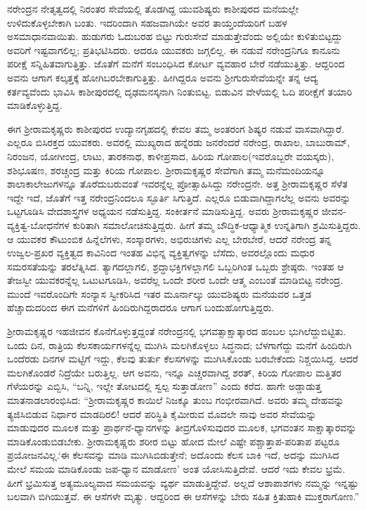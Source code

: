 ನರೇಂದ್ರನ ನೇತೃತ್ವದಲ್ಲಿ ನಿರಂತರ ಸೇವೆಯಲ್ಲಿ ತೊಡಗಿದ್ದ ಯುವಶಿಷ್ಯರು ಕಾಶೀಪುರದ ಮನೆಯಲ್ಲೇ ಉಳಿದುಕೊಳ್ಳಬೇಕಾಗಿ ಬಂತು. ಇದರಿಂದಾಗಿ ಸಹಜವಾಗಿಯೇ ಅವರ ತಾಯ್ತಂದೆಯರಿಗೆ ಬಹಳ ಅಸಮಾಧಾನವಾಯಿತು. ಹುಡುಗರು ಓದುಬರಹ ಬಿಟ್ಟು ಗುರುಸೇವೆ ಮಾಡುತ್ತೇವೆಂದು ಅಲ್ಲಿಯೇ ಕುಳಿತುಬಿಟ್ಟದ್ದು ಅವರಿಗೆ ಇಷ್ಟವಾಗಲಿಲ್ಲ; ಪ್ರತಿಭಟಿಸಿದರು. ಆದರೂ ಯುವಕರು ಜಗ್ಗಲಿಲ್ಲ. ಈ ನಡುವೆ ನರೇಂದ್ರನಿಗೂ ಕಾನೂನು ಪರೀಕ್ಷೆ ಸನ್ನಿಹಿತವಾಗುತ್ತಿತ್ತು. ಜೊತೆಗೆ ಮನೆಗೆ ಸಂಬಂಧಿಸಿದ ಕೋರ್ಟ ವ್ಯವಹಾರ ಬೇರೆ ನಡೆಯುತ್ತಿತ್ತು. ಆದ್ದರಿಂದ ಅವನು ಆಗಾಗ ಕಲ್ಕತ್ತಕ್ಕೆ ಹೋಗಿಬರಬೇಕಾಗುತ್ತಿತ್ತು. ಹೀಗಿದ್ದರೂ ಅವನು ಶ್ರೀಗುರುಸೇವೆಯನ್ನೇ ತನ್ನ ಆದ್ಯ ಕರ್ತವ್ಯವೆಂದು ಭಾವಿಸಿ ಕಾಶೀಪುರದಲ್ಲಿ ದೃಢಮನಸ್ಕನಾಗಿ ನಿಂತುಬಿಟ್ಟ. ಬಿಡುವಿನ ವೇಳೆಯಲ್ಲಿ ಓದಿ ಪರೀಕ್ಷೆಗೆ ತಯಾರಿ ಮಾಡಿಕೊಳ್ಳುತ್ತಿದ್ದ.

ಈಗ ಶ್ರೀರಾಮಕೃಷ್ಣರು ಕಾಶೀಪುರದ ಉದ್ಯಾನಗೃಹದಲ್ಲಿ ಕೇವಲ ತಮ್ಮ ಅಂತರಂಗ ಶಿಷ್ಯರ ನಡುವೆ ವಾಸವಾಗಿದ್ದಾರೆ. ಎಲ್ಲರೂ ಬಿಸಿರಕ್ತದ ಯುವಕರು. ಅವರಲ್ಲಿ ಮುಖ್ಯರಾದ ಹನ್ನೆರಡು ಜನರೆಂದರೆ ನರೇಂದ್ರ, ರಾಖಾಲ, ಬಾಬುರಾಮ್, ನಿರಂಜನ, ಯೋಗೀಂದ್ರ, ಲಾಟು, ತಾರಕನಾಥ, ಕಾಳೀಪ್ರಸಾದ, ಹಿರಿಯ ಗೋಪಾಲ(ಇವರೊಬ್ಬರೇ ವಯಸ್ಕರು), ಶಶಿಭೂಷಣ, ಶರಚ್ಚಂದ್ರ ಮತ್ತು ಕಿರಿಯ ಗೋಪಾಲ. ಶ್ರೀರಾಮಕೃಷ್ಣರ ಸೇವೆಗಾಗಿ ತಮ್ಮ ಮನೆಮಂದಿಯನ್ನೂ ಶಾಲಾಕಾಲೇಜುಗಳನ್ನೂ ತೊರೆದುಬರುವಂತೆ ಇವರನ್ನೆಲ್ಲ ಪ್ರೋತ್ಸಾಹಿಸಿದ್ದು ನರೇಂದ್ರನೇ. ಅತ್ತ ಶ್ರೀರಾಮಕೃಷ್ಣರ ಸೆಳೆತ ಇದ್ದೇ ಇದೆ, ಜೊತೆಗೆ ಇತ್ತ ನರೇಂದ್ರನಿಂದಲೂ ಸ್ಫೂರ್ತಿ ಸಿಗುತ್ತಿದೆ. ಎಲ್ಲರೂ ಬಿಡುವಾಗಿದ್ದಾಗಲೆಲ್ಲ ಅವನು ಅವರನ್ನು ಒಟ್ಟಗೂಡಿಸಿ ವೇದಶಾಸ್ತ್ರಗಳ ಅಧ್ಯಯನ ನಡೆಸುತ್ತಿದ್ದ. ಸಂಕೀರ್ತನೆ ಮಾಡಿಸುತ್ತಿದ್ದ. ಅವರು ಶ್ರೀರಾಮಕೃಷ್ಣರ ಜೀವನ-ವ್ಯಕ್ತಿತ್ವ-ಬೋಧನೆಗಳ ಕುರಿತಾಗಿ ಸಮಾಲೋಚಿಸುತ್ತಿದ್ದರು. ಹೀಗೆ ತಮ್ಮ ಬೌದ್ಧಿಕ-ಆಧ್ಯಾತ್ಮಿಕ ಉನ್ನತಿಗಾಗಿ ಶ್ರಮಿಸುತ್ತಿದ್ದರು. ಆ ಯುವಕರ ಕೌಟುಂಬಿಕ ಹಿನ್ನೆಲೆಗಳು, ಸಂಸ್ಕಾರಗಳು, ಅಭಿರುಚಿಗಳು ಎಲ್ಲ ಬೇರಬೇರೆ, ಆದರೆ ನರೇಂದ್ರ ತನ್ನ ಉಜ್ವಲ-ಪ್ರಖರ ವ್ಯಕ್ತಿತ್ವದ ಕಾವಿನಿಂದ ಇಂತಹ ವಿಭಿನ್ನ ವ್ಯಕ್ತಿತ್ವಗಳನ್ನು ಬೆಸೆದು, ಅವರಲ್ಲೊಂದು ಮಧುರ ಸಮರಸತೆಯನ್ನು ತರಲೆತ್ನಿಸಿದ. ತ್ಯಾಗದಲ್ಲಾಗಲಿ, ಶ್ರದ್ಧಾಭಕ್ತಿಗಳಲ್ಲಾಗಲಿ ಒಬ್ಬರಿಗಿಂತ ಒಬ್ಬರು ಶ್ರೇಷ್ಠರು. ಇಂತಹ ಆ ತೇಜಸ್ವೀ ಯುವಕರನ್ನೆಲ್ಲ ಒಟುಟಗೂಡಿಸಿ, ಅವರೆಲ್ಲ ಒಂದೇ ಶರೀರ ಒಂದೇ ಆತ್ಮ ಎಂಬಂತೆ ಮಾಡಿಬಿಟ್ಟ ನರೇಂದ್ರ. ಮುಂದೆ ಇವರೊಂದಿಗೇ ಸಂನ್ಯಾಸ ಸ್ವೀಕರಿಸಿದ ಇತರ ಮೂರ್ನಾಲ್ಕು ಯುವಶಿಷ್ಯರು ಮನೆಯವರ ಒತ್ತಡ ಹೆಚ್ಚಾದುದರಿಂದ ಈಗ ಮನೆಗಳಿಗೆ ಹಿಂದಿರುಗಿದ್ದರಾದರೂ ಆಗಾಗ ಬಂದುಹೋಗುತ್ತಿದ್ದರು.

ಶ್ರೀರಾಮಕೃಷ್ಣರ ಇಹಜೀವನ ಕೊನೆಗೊಳ್ಳುತ್ತದ್ದಂತೆ ನರೇಂದ್ರನಲ್ಲಿ ಭಗವತ್ಸಾಕ್ಷಾತ್ಕಾರದ ಹಂಬಲ ಭುಗಿಲೆದ್ದುಬಿಟ್ಟಿತು. ಒಂದು ದಿನ, ರಾತ್ರಿಯ ಕೆಲಸಕಾರ್ಯಗಳನ್ನೆಲ್ಲ ಮುಗಿಸಿ ಮಲಗಿಕೊಳ್ಳಲು ಸಿದ್ಧನಾದ; ಬೆಳಗಾಗೆದ್ದು ಮನೆಗೆ ಹಿಂದಿರುಗಿ ಒಂದೆರಡು ದಿನಗಳ ಮಟ್ಟಿಗೆ ಇದ್ದು, ಕೆಲವು ತುರ್ತು ಕೆಲಸಗಳನ್ನು ಮುಗಿಸಿಕೊಂಡು ಬರಬೇಕೆಂದು ನಿಶ್ಚಯಿಸಿದ್ದ. ಆದರೆ ಮಲಗಿಕೊಂಡರೆ ನಿದ್ರೆಯೇ ಬರುತ್ತಿಲ್ಲ. ಆಗ ಅವನು, ಇನ್ನೂ ಎಚ್ಚರವಾಗಿದ್ದ ಶರತ್, ಕಿರಿಯ ಗೋಪಾಲ ಮತ್ತಿತರ ಗೆಳೆಯರನ್ನು ಎಬ್ಬಿಸಿ, “ಬನ್ನಿ, ಇಲ್ಲೇ ತೋಟದಲ್ಲಿ ಸ್ವಲ್ಪ ಸುತ್ತಾಡೋಣ” ಎಂದು ಕರೆದ. ಹಾಗೇ ಅಡ್ಡಾಡುತ್ತ ಮಾತನಾಡಲಾರಂಭಿಸಿದ: “ಶ್ರೀರಾಮಕೃಷ್ಣರ ಕಾಯಿಲೆ ನಿಜಕ್ಕೂ ತುಂಬ ಗಂಭೀರವಾಗಿದೆ. ಅವರು ತಮ್ಮ ದೇಹವನ್ನು ತ್ಯಜಿಸಿಬಿಡುವ ನಿರ್ಧಾರ ಮಾಡದಿರಲಿ! ಆದರೆ ಪರಿಸ್ಥಿತಿ ಕೈಮೀರುವ ಮೊದಲೇ ನಾವು ಅವರ ಸೇವೆಯನ್ನು ಮಾಡುವುದರ ಮೂಲಕ ಮತ್ತು ಪ್ರಾರ್ಥನೆ-ಧ್ಯಾನಗಳನ್ನು ತೀವ್ರಗೊಳಿಸುವುದರ ಮೂಲಕ, ಭಗವಂತನ ಸಾಕ್ಷಾತ್ಕಾರವನ್ನು ಮಾಡಿಕೊಂಡುಬಿಡಬೇಕು. ಶ್ರೀರಾಮಕೃಷ್ಣರು ಶರೀರ ಬಿಟ್ಟು ಹೋದ ಮೇಲೆ ಎಷ್ಟೇ ಪಶ್ಚಾತ್ತಾಪ-ಪರಿತಾಪ ಪಟ್ಟರೂ ಪ್ರಯೋಜನವಿಲ್ಲ.‘ಈ ಕೆಲಸವನ್ನು ಮಾಡಿ ಮುಗಿಸಿಬಿಡುತ್ತೇನೆ; ಅದೊಂದು ಕೆಲಸ ಬಾಕಿ ಇದೆ, ಅದನ್ನು ಮುಗಿಸಿದ ಮೇಲೆ ಸಮಯ ಮಾಡಿಕೊಂಡು ಜಪ-ಧ್ಯಾನ ಮಾಡೋಣ’ ಅಂತ ಯೋಸಿಸುತ್ತಿದೇವೆ. ಆದರೆ ಇದು ಕೇವಲ ಭ್ರಮೆ. ಹೀಗೆ ಭ್ರಮಿಸುತ್ತ ಅತ್ಯಮೂಲ್ಯವಾದ ಸಮಯವನ್ನು ವ್ಯರ್ಥ ಮಾಡುತ್ತಿದ್ದೇವೆ. ಅಲ್ಲದೆ ಆಶಾಪಾಶಗಳು ನಮ್ಮನ್ನು ಇನ್ನಷ್ಟು ಬಲವಾಗಿ ಬಿಗಿಯುತ್ತವೆ. ಈ ಆಸೆಗಳೇ ಮೃತ್ಯು. ಆದ್ದರಿಂದ ಈ ಆಸೆಗಳನ್ನು ಬೇರು ಸಹಿತ ಕ್ತಿತುಹಾಕಿ ಮುಕ್ತರಾಗೋಣ.”

